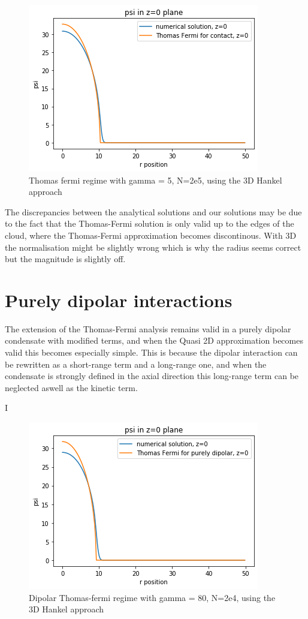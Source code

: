 \documentclass[10pt]{article}
\begin{document}
\begin{multicols}{2}
\begin{figure}[H]
\centering
\includegraphics[width=0.6\linewidth]{Contact Thomas Fermi 3D Hankel gamma=5 No=2e5}
\caption{Thomas fermi regime with gamma = 5, N=2e5, using the 3D Hankel approach}
\end{figure}

The discrepancies between the analytical solutions and our solutions may be due to the fact that the Thomas-Fermi solution is only valid up to the edges of the cloud, where the Thomas-Fermi approximation becomes discontinous. With 3D the normalisation might be slightly wrong which is why the radius seems correct but the magnitude is slightly off.
\section{Purely dipolar interactions}
The extension of the Thomas-Fermi analysis remains valid in a purely dipolar condensate with modified terms, and when the Quasi 2D approximation becomes valid this becomes especially simple. This is because the dipolar interaction can be rewritten as a short-range term and a long-range one, and when the condensate is strongly defined in the axial direction this long-range term can be neglected aswell as the kinetic term.

I  
 
\begin{figure}[H]
\centering
\includegraphics[width=0.6\linewidth]{Dipolar Thomas Fermi 3D Hankel gamma = 80 No=2e4}
\caption{Dipolar Thomas-fermi regime with gamma = 80, N=2e4, using the 3D Hankel approach}
\end{figure}


\end{multicols}
\end{document}
